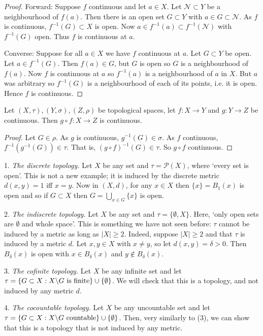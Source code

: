 \begin{proof}
Forward: Suppose $f$ continuous and let $a\in X$. Let $\mathcal{N}\subset Y$ be a neighbourhood of $f(a)$. Then there is an open set $G\subset Y$ with $a\in G\subset \mathcal{N}$. As $f$ is continuous, $f^{-1}(G)\subset X$ is open. Now $a\in f^{-1}(a)\subset f^{-1}(\mathcal{N})$ with $f^{-1}(G)$ open. Thus $f$ is continuous at $a$.

Converse: Suppose for all $a\in X$ we have $f$ continuous at $a$. Let $G\subset Y$ be open. Let $a\in f^{-1}(G).$ Then $f(a)\in G$, but $G$ is open so $G$ is a neighbourhood of $f(a)$. Now $f$ is continuous at $a$ so $f^{-1}(a)$ is a neighbourhood of $a$ in $X$. But $a$ was arbitrary so $f^{-1}(G)$ is a neighbourhood of each of its points, i.e. it is open. Hence $f$ is continuous.
\end{proof}

\begin{proposition}
Let $(X,\tau), (Y,\sigma), (Z,\rho)$ be topological spaces, let $f:X\rightarrow Y$ and $g:Y\rightarrow Z$ be continuous. Then $g\circ f: X\rightarrow Z$ is continuous.
\end{proposition}

\begin{proof}
Let $G\in \rho$. As $g$ is continuous, $g^{-1}(G)\in \sigma$. As $f$ continuous, $f^{-1}(g^{-1}(G))\in \tau$. That is, $(g\circ f)^{-1}(G)\in \tau$. So $g\circ f$ continuous.
\end{proof}

\begin{example}
1. \emph{The discrete topology.} Let $X$ be any set and $\tau = \mathcal{P}(X)$, where `every set is open'. This is not a new example; it is induced by the discrete metric $d(x,y) = 1$ iff $x=y$. Now in $(X,d)$, for any $x\in X$ then $\{x\} = B_1(x)$ is open and so if $G\subset X$ then $G = \bigcup_{x\in G} \{x\}$ is open.

2. \emph{The indiscrete topology.} Let $X$ be any set and $\tau = \{\emptyset, X\}$. Here, `only open sets are $\emptyset$ and whole space'. This is something we have not seen before: $\tau$ cannot be induced by a metric as long as $|X|\ge 2$. Indeed, suppose $|X|\ge 2$ and that $\tau $ is induced by a metric $d$. Let $x,y\in X$ with $x\neq y$, so let $d(x,y) = \delta>0$. Then $B_\delta(x)$ is open with $x\in B_\delta(x)$ and $y\not\in B_\delta(x)$.

3. \emph{The cofinite topology.} Let $X$ be any infinite set and let $\tau = \{G\subset X : X \backslash G \textup{ is finite} \} \cup \{\emptyset\}$. We will check that this is a topology, and not induced by any metric $d$. 

4. \emph{The cocountable topology.} Let $X$ be any uncountable set and let $\tau = \{G\subset X : X\backslash G \textup{ countable} \} \cup \{\emptyset\}$. Then, very similarly to (3), we can show that this is a topology that is not induced by any metric.
\end{example}


